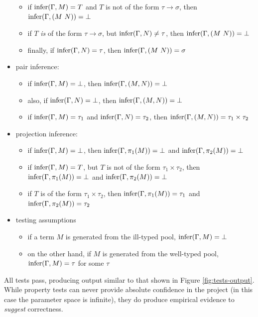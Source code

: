 \begin{itemize}
\begin{itemize}
\item if \(\mathrm{infer}(\Gamma, M) = T\) and \(T\) is not of the form \(\tau \to \sigma\), then \(\mathrm{infer}(\Gamma, (M\ N)) = \bot\)
\item if \(T\) \emph{is} of the form \(\tau \to \sigma\), but \(\mathrm{infer}(\Gamma, N) \neq \tau\), then \(\mathrm{infer}(\Gamma, (M\ N)) = \bot\)
\item finally, if \(\mathrm{infer}(\Gamma, N) = \tau\), then \(\mathrm{infer}(\Gamma, (M\ N)) = \sigma\)
\end{itemize}
\item pair inference:
\begin{itemize}
\item if \(\mathrm{infer}(\Gamma, M) = \bot\), then \(\mathrm{infer}(\Gamma, (M, N)) = \bot\)
\item also, if \(\mathrm{infer}(\Gamma, N) = \bot\), then \(\mathrm{infer}(\Gamma, (M, N)) = \bot\)
\item if \(\mathrm{infer}(\Gamma, M) = \tau_1\) and \(\mathrm{infer}(\Gamma, N) = \tau_2\), then \(\mathrm{infer}(\Gamma, (M, N)) = \tau_1 \times \tau_2\)
\end{itemize}
\item projection inference:
\begin{itemize}
\item if \(\mathrm{infer}(\Gamma, M) = \bot\), then \(\mathrm{infer}(\Gamma, \pi_1(M)) = \bot\) and \(\mathrm{infer}(\Gamma, \pi_2(M)) = \bot\)
\item if \(\mathrm{infer}(\Gamma, M) = T\), but \(T\) is not of the form \(\tau_1 \times \tau_2\), then \(\mathrm{infer}(\Gamma, \pi_1(M)) = \bot\) and \(\mathrm{infer}(\Gamma, \pi_2(M)) = \bot\)
\item if \(T\) is of the form \(\tau_1 \times \tau_2\), then \(\mathrm{infer}(\Gamma, \pi_1(M)) = \tau_1\) and \(\mathrm{infer}(\Gamma, \pi_2(M)) = \tau_2\)
\end{itemize}
\item testing assumptions
\begin{itemize}
\item if a term \(M\) is generated from the ill-typed pool, \(\mathrm{infer}(\Gamma, M) = \bot\)
\item on the other hand, if \(M\) is generated from the well-typed pool, \(\mathrm{infer}(\Gamma, M) = \tau\) for some \(\tau\)
\end{itemize}
\end{itemize}

All tests pass, producing output similar to that shown in Figure \ref{fig:tests-output}.
While property tests can never provide absolute confidence in the project (in this case the parameter space is infinite), they do produce empirical evidence to \emph{suggest} correctness.

